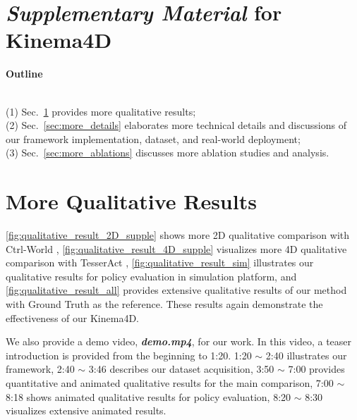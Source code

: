\clearpage
\begin{appendices}
\section*{\Large \textit{Supplementary Material} for Kinema4D}
\renewcommand{\thesection}{\Alph{section}}%
\renewcommand\thetable{\Roman{table}}
\renewcommand\thefigure{\Roman{figure}}

\centerline{\large{\textbf{Outline}}}
\\
(1) Sec.~\ref{sec:more_qualitative_results} provides more qualitative results;\\
(2) Sec.~\ref{sec:more_details} elaborates more technical details and discussions of our framework implementation, dataset, and real-world deployment;\\
(3) Sec.~\ref{sec:more_ablations} discusses more ablation studies and analysis.\\

\section{More Qualitative Results}
\label{sec:more_qualitative_results}

\cref{fig:qualitative_result_2D_supple} shows more 2D qualitative comparison with Ctrl-World \cite{guo2026ctrl}, \cref{fig:qualitative_result_4D_supple} visualizes more 4D qualitative comparison with TesserAct \cite{zhen2025tesseract}, \cref{fig:qualitative_result_sim} illustrates our qualitative results for policy evaluation in simulation platform, and \cref{fig:qualitative_result_all} provides extensive qualitative results of our method with Ground Truth as the reference. These results again demonstrate the effectiveness of our Kinema4D.

We also provide a demo video, \textbf{\textit{demo.mp4}}, for our work. In this video, a teaser introduction is provided from the beginning to 1:20. 1:20 $\sim$ 2:40 illustrates our framework, 2:40 $\sim$ 3:46 describes our dataset acquisition, 3:50 $\sim$ 7:00 provides quantitative and animated qualitative results for the main comparison, 7:00 $\sim$ 8:18 shows animated qualitative results for policy evaluation, 8:20 $\sim$ 8:30 visualizes extensive animated results.



\end{appendices}
